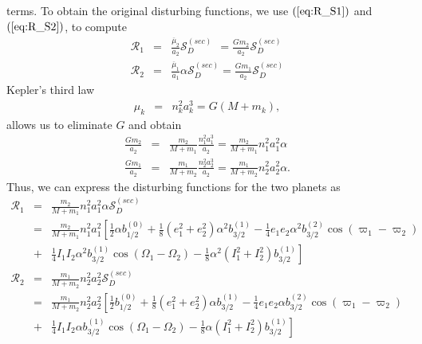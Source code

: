 \documentclass [12pt, a4paper] {article}
\begin{document}
terms. To obtain the original disturbing functions, we use 
$(\ref{eq:R_S1})$ and $(\ref{eq:R_S2})$, to compute 
\begin {eqnarray}
    \mathcal{R}_1 
    &=& 
    \frac{\overline\mu_2}{a_2}
    \mathcal{S}_D^{(sec)}
    \:\:=
    \frac{Gm_2}{a_2}
    \mathcal{S}_D^{(sec)}
    \\
    \mathcal{R}_2
    &=& 
    \frac{\overline\mu_1}{a_1}
    \alpha\mathcal{S}_D^{(sec)}
    =
    \frac{Gm_1}{a_2}
    \mathcal{S}_D^{(sec)}
\end {eqnarray}
Kepler's third law
\begin {eqnarray}
    \mu_k &=& n_k^2a_k^3 = G(M + m_k),
\end {eqnarray}
allows us to eliminate $G$ and obtain 
\begin {eqnarray}
    \frac{Gm_2}{a_2} 
    &=& 
    \frac{m_2}{M + m_1}\frac{n_1^2a_1^3}{a_2}
    = \frac{m_2}{M + m_1}n_1^2a_1^2\alpha  
    \\
    \frac{Gm_1}{a_2} 
    &=& 
    \frac{m_1}{M + m_2}\frac{n_2^2a_2^3}{a_2}
    = \frac{m_1}{M + m_2}n_2^2a_2^2\alpha.
\end {eqnarray}
Thus, we can express the disturbing functions for the two planets as 
\begin {eqnarray}
    \mathcal{R}_1
    &=& 
    \frac{m_2}{M + m_1}n_1^2a_1^2\alpha\mathcal{S}_D^{(sec)}
    \\
    &=&
    \frac{m_2}{M + m_1}n_1^2a_1^2
    \left[
        \frac{1}{2}\alpha b_{1/2}^{(0)}
        + 
        \frac{1}{8}(e_1^2 + e_2^2)\alpha^2 b_{3/2}^{(1)}
        - 
        \frac{1}{4}e_1e_2\alpha^2b_{3/2}^{(2)}\cos(\varpi_1 - \varpi_2)
        \right.
        \\\nonumber
        &+&
        \left. 
        \frac{1}{4}I_1I_2\alpha^2b_{3/2}^{(1)}\cos(\Omega_1 - \Omega_2)
        - 
        \frac{1}{8}\alpha^2(I_1^2 + I_2^2)b_{3/2}^{(1)}
    \right]
    \\
    \mathcal{R}_2
    &=& 
    \frac{m_1}{M + m_2}n_2^2a_2^2\mathcal{S}_D^{(sec)}
    \\
    &=&
    \frac{m_1}{M + m_2}n_2^2a_2^2
    \left[
        \frac{1}{2}b_{1/2}^{(0)}
        + 
        \frac{1}{8}(e_1^2 + e_2^2)\alpha b_{3/2}^{(1)}
        - 
        \frac{1}{4}e_1e_2\alpha b_{3/2}^{(2)}\cos(\varpi_1 - \varpi_2)
        \right.
        \\\nonumber
        &+&
        \left. 
        \frac{1}{4}I_1I_2\alpha b_{3/2}^{(1)}\cos(\Omega_1 - \Omega_2)
        - 
        \frac{1}{8}\alpha(I_1^2 + I_2^2)b_{3/2}^{(1)}
    \right]
\end {eqnarray}
\end{document}
